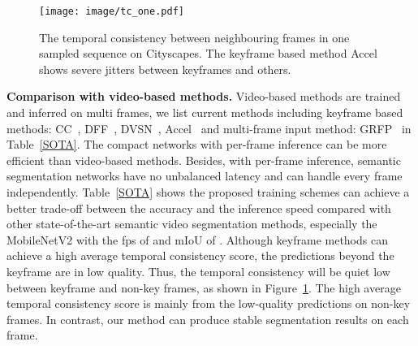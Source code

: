 \documentclass[runningheads]{llncs}
\begin{document}
\begin{figure}[t]
    \centering
    \texttt{[image: image/tc\_one.pdf]}
    \caption{The temporal consistency between neighbouring frames in one sampled sequence on Cityscapes. The keyframe based method Accel
    shows
    severe jitters between keyframes and others.}
    \label{fig:tc_one}

\end{figure}{}

\noindent\textbf{Comparison with video-based methods.}
Video-based methods are trained and inferred on multi frames, we list current methods including keyframe based methods: CC~\cite{shelhamer2016clockwork}, DFF~\cite{zhu2017deep}, DVSN~\cite{xu2018dynamic}, Accel~\cite{jain2019accel}  and multi-frame input method: GRFP~\cite{nilsson2018semantic} in Table~\ref{SOTA}. The compact networks with per-frame inference can be more efficient than video-based methods. Besides, with per-frame inference, semantic segmentation networks have no unbalanced latency and can handle every frame independently.
Table~\ref{SOTA} shows the proposed training schemes can achieve a better trade-off between the accuracy and the inference speed compared with other state-of-the-art semantic video segmentation methods, especially the MobileNetV2 with the fps of  and mIoU of . Although keyframe methods can achieve a high average temporal consistency score, the predictions beyond the keyframe are in low quality. Thus, the temporal consistency will be quiet low between keyframe and non-key frames, as shown in Figure~\ref{fig:tc_one}. The high average temporal consistency score is mainly from the low-quality predictions on non-key frames. In contrast, our method can produce stable segmentation results on each frame.
\end{document}
